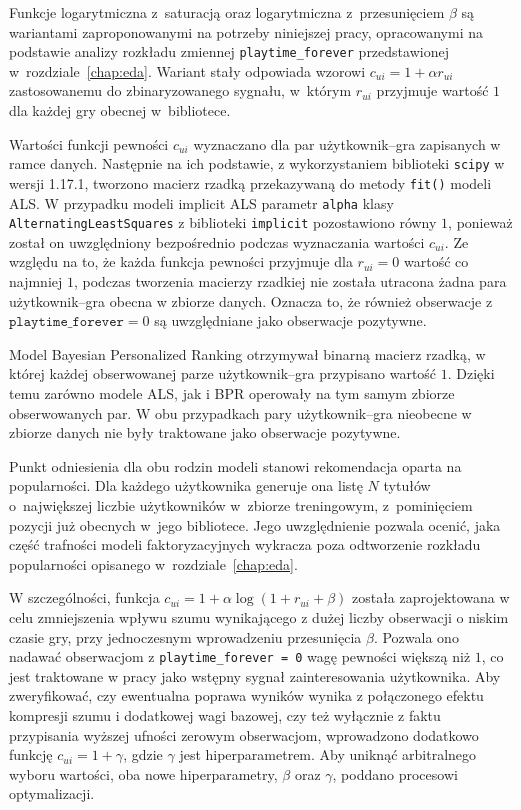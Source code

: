 Funkcje logarytmiczna z~saturacją oraz logarytmiczna z~przesunięciem $\beta$ są wariantami zaproponowanymi na potrzeby niniejszej pracy, opracowanymi na podstawie analizy rozkładu zmiennej \texttt{playtime\_forever} przedstawionej w~rozdziale~\ref{chap:eda}. Wariant stały odpowiada wzorowi $c_{ui} = 1 + \alpha r_{ui}$ zastosowanemu do zbinaryzowanego sygnału, w~którym $r_{ui}$ przyjmuje wartość $1$ dla każdej gry obecnej w~bibliotece.

Wartości funkcji pewności $c_{ui}$ wyznaczano dla par użytkownik--gra zapisanych w ramce danych. Następnie na ich podstawie, z wykorzystaniem biblioteki \texttt{scipy} w wersji 1.17.1, tworzono macierz rzadką przekazywaną do metody \texttt{fit()} modeli ALS. W przypadku modeli implicit ALS parametr \texttt{alpha} klasy \texttt{AlternatingLeastSquares} z biblioteki \texttt{implicit} pozostawiono równy $1$, ponieważ został on uwzględniony bezpośrednio podczas wyznaczania wartości $c_{ui}$. Ze względu na to, że każda funkcja pewności przyjmuje dla $r_{ui}=0$ wartość co najmniej $1$, podczas tworzenia macierzy rzadkiej nie została utracona żadna para użytkownik--gra obecna w zbiorze danych. Oznacza to, że również obserwacje z $\texttt{playtime\_forever}=0$ są uwzględniane jako obserwacje pozytywne.

Model Bayesian Personalized Ranking otrzymywał binarną macierz rzadką, w której każdej obserwowanej parze użytkownik--gra przypisano wartość $1$. Dzięki temu zarówno modele ALS, jak i BPR operowały na tym samym zbiorze obserwowanych par. W obu przypadkach pary użytkownik--gra nieobecne w zbiorze danych nie były traktowane jako obserwacje pozytywne.

Punkt odniesienia dla obu rodzin modeli stanowi rekomendacja oparta na popularności. Dla każdego użytkownika generuje ona listę $N$ tytułów o~największej liczbie użytkowników w~zbiorze treningowym, z~pominięciem pozycji już obecnych w~jego bibliotece. Jego uwzględnienie
pozwala ocenić, jaka część trafności modeli faktoryzacyjnych wykracza poza odtworzenie rozkładu popularności opisanego w~rozdziale~\ref{chap:eda}.

W szczególności, funkcja $c_{ui} = 1 + \alpha \log(1 + r_{ui} + \beta)$ została zaprojektowana w celu zmniejszenia wpływu szumu wynikającego z dużej liczby obserwacji o niskim czasie gry, przy jednoczesnym wprowadzeniu przesunięcia $\beta$. Pozwala ono nadawać obserwacjom z \texttt{playtime\_forever = 0} wagę pewności większą niż $1$, co jest traktowane w pracy jako wstępny sygnał zainteresowania użytkownika. Aby zweryfikować, czy ewentualna poprawa wyników wynika z połączonego efektu kompresji szumu i dodatkowej wagi bazowej, czy też wyłącznie z faktu przypisania wyższej ufności zerowym obserwacjom, wprowadzono dodatkowo funkcję $c_{ui} = 1 + \gamma$, gdzie $\gamma$ jest hiperparametrem. Aby uniknąć arbitralnego wyboru wartości, oba nowe hiperparametry, $\beta$ oraz $\gamma$, poddano procesowi optymalizacji.


